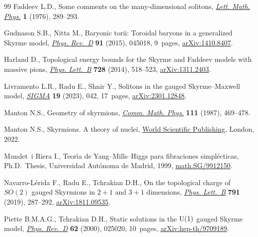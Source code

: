 \documentclass[10pt,a4paper]{amsart}
\newcommand{\1}{{\mathbb{1}}}
\numberwithin{equation}{section}
\begin{document}
\begin{thebibliography}{99}
Faddeev L.D., Some comments on the many-dimensional solitons, \href{https://doi.org/10.1007/BF00398483}{\textit{Lett.
 Math. Phys.}} \textbf{1} (1976), 289--293.

Gudnason S.B., Nitta M., Baryonic torii: {T}oroidal baryons in a generalized
 {S}kyrme model, \href{https://doi.org/10.1103/PhysRevD.91.045027}{\textit{Phys. Rev.~D}} \textbf{91} (2015), 045018, 9~pages,
 \href{https://arxiv.org/abs/1410.8407}{arXiv:1410.8407}.

Harland D., Topological energy bounds for the {S}kyrme and {F}addeev models
 with massive pions, \href{https://doi.org/10.1016/j.physletb.2013.11.062}{\textit{Phys. Lett.~B}} \textbf{728} (2014), 518--523,
 \href{https://arxiv.org/abs/1311.2403}{arXiv:1311.2403}.

Livramento L.R., Radu E., Shnir Y., Solitons in the gauged {S}kyrme--{M}axwell
 model, \href{https://doi.org/10.3842/SIGMA.2023.042}{\textit{SIGMA}} \textbf{19}
 (2023), 042, 17~pages, \href{https://arxiv.org/abs/2301.12848}{arXiv:2301.12848}.

Manton N.S., Geometry of skyrmions, \href{https://doi.org/10.1007/BF01238909}{\textit{Comm. Math. Phys.}} \textbf{111}
 (1987), 469--478.

Manton N.S., Skyrmions. {A} theory of nuclei, \href{https://doi.org/10.1142/q0368}{World Scientific Publishing},
 London, 2022.

Mundet~i Riera I., Teor\'{\i}a de {Y}ang--{M}ills--{H}iggs para fibraciones simpl\'ecticas, Ph.D.~Thesis, {U}niversidad {A}ut\'onoma de {M}adrid, 1999,
 \href{https://arxiv.org/abs/math.SG/9912150}{math.SG/9912150}.

Navarro-L\'erida F., Radu E., Tchrakian D.H., On the topological charge of
 {$SO(2)$} gauged {S}kyrmions in {$2+1$} and {$3+1$} dimensions, \href{https://doi.org/10.1016/j.physletb.2019.02.011}{\textit{Phys.
 Lett.~B}} \textbf{791} (2019), 287--292, \href{https://arxiv.org/abs/1811.09535}{arXiv:1811.09535}.

Piette B.M.A.G., Tchrakian D.H., Static solutions in the {${\rm U}(1)$} gauged
 {S}kyrme model, \href{https://doi.org/10.1103/PhysRevD.62.025020}{\textit{Phys. Rev.~D}} \textbf{62} (2000), 025020, 10~pages,
 \href{https://arxiv.org/abs/hep-th/9709189}{arXiv:hep-th/9709189}.


\end{thebibliography}
\end{document}
